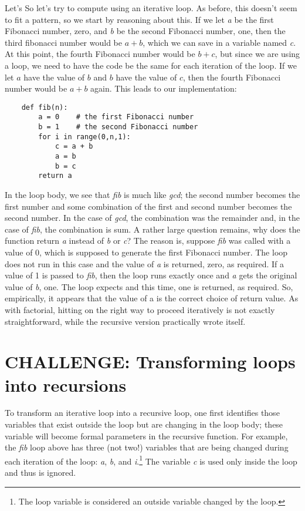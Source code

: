 Let's So let's try to compute
using an iterative loop. As before, this doesn't seem
to fit a pattern, so we start by reasoning about this.
If we let {\it a} be the first Fibonacci number, zero, and {\it b}
be the second Fibonacci number, one, then the third fibonacci
number would be $a + b$, which we can save in a variable 
named {\it c}.
At  this point, the fourth Fibonacci number would be $b + c$,
but since we are using a loop, we need to have the code be
the same for each iteration of the loop. If we let $a$ have the
value of $b$ and $b$ have the value of $c$, then the fourth Fibonacci
number would be $a + b$ again.
This leads to our implementation:

\begin{verbatim}
    def fib(n):
        a = 0    # the first Fibonacci number
        b = 1    # the second Fibonacci number
        for i in range(0,n,1):
            c = a + b
            a = b
            b = c
        return a
\end{verbatim}

In the loop body, we see that {\it fib} is much like {\it gcd};
the second number becomes the first number and some combination of
the first and second number becomes the second number.
In the case of {\it gcd}, the combination was the remainder and, in the
case of {\it fib}, the combination is sum.
A rather large question remains, why does the function return {\it a}
instead of {\it b} or {\it c}? The reason is, suppose {\it fib} was
called with a value of 0, which is supposed to generate
the first Fibonacci number. The loop does not run in this case
and the value of {\it a} is returned, zero, as required.
If a value of 1 is passed to {\it fib}, then the loop runs exactly
once and {\it a} gets the original value of {\it b}, one. The loop expects and
this time, one is returned, as required. So, empirically, it
appears that the value of a is the correct choice of return value.
As with factorial, hitting on the right way to proceed iteratively
is not exactly straightforward, while the recursive version
practically wrote itself.

\section{CHALLENGE: Transforming loops into recursions}

To transform an iterative loop into a
recursive loop, one first identifies those variables
that exist outside the loop but are changing in the loop body;
these variable will become formal parameters in the recursive
function.
For example, the {\it fib} loop above has three (not two!)
variables that
are being changed during each iteration of the loop:
{\it a}, {\it b}, and {\it i}.\footnote{The loop variable
is considered an outside variable changed by the loop.} 
The variable {\it c} is used only inside the loop and thus is
ignored.

